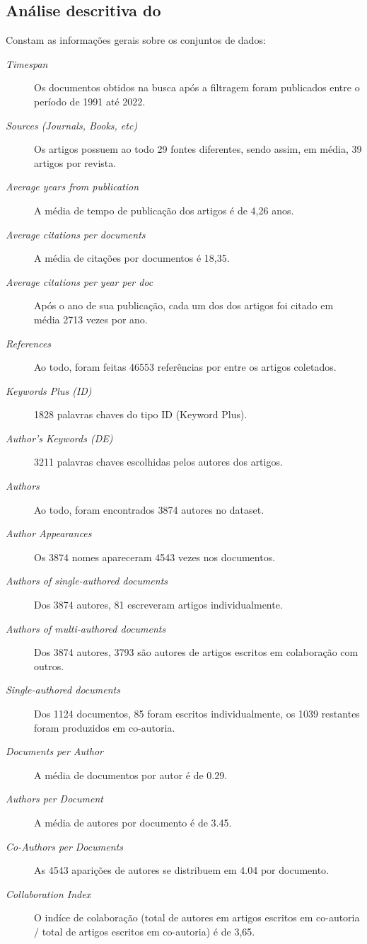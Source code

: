 \subsection{Análise descritiva do \dataset\   }

Constam as informações gerais sobre os conjuntos de dados:
\begin{description}
    \item [\textit{Timespan}] Os documentos obtidos na busca após a filtragem foram publicados entre o período de 1991 até 2022.
    \item [\textit{Sources (Journals, Books, etc)}] Os artigos possuem ao todo 29 fontes diferentes, sendo assim, em média, 39 artigos por revista.
    \item [\textit{Average years from publication}] A média de tempo de publicação dos artigos é de 4,26 anos.
    \item [\textit{Average citations per documents}] A média de citações por documentos é 18,35.
    \item [\textit{Average citations per year per doc}] Após o ano de sua publicação, cada um dos dos artigos foi citado em média 2713 vezes por ano.
    \item [\textit{References}] Ao todo, foram feitas 46553  referências por entre os artigos coletados.
    \item [\textit{Keywords Plus (ID)}] 1828 palavras chaves do tipo ID (Keyword Plus).
    \item [\textit{Author's Keywords (DE)}]  3211 palavras chaves escolhidas pelos autores dos artigos.

    \item [\textit{Authors}]  Ao todo, foram encontrados 3874 autores no dataset.
    \item [\textit{Author Appearances}] Os 3874 nomes apareceram 4543 vezes nos documentos.
    \item [\textit{Authors of single-authored documents}] Dos 3874 autores, 81 escreveram artigos individualmente.
    \item [\textit{Authors of multi-authored documents}] Dos 3874 autores, 3793 são autores de artigos escritos em colaboração com outros.
    \item [\textit{Single-authored documents}] Dos 1124 documentos, 85 foram escritos individualmente, os 1039 restantes foram produzidos em co-autoria.
    \item [\textit{Documents per Author}] A média de documentos por autor é de 0.29.
    \item [\textit{Authors per Document}] A média de autores por documento é de 3.45.
    \item [\textit{Co-Authors per Documents}] As 4543 aparições de autores se distribuem em 4.04 por documento.
    \item [\textit{Collaboration Index}] O indíce de colaboração (total de autores em artigos escritos em co-autoria / total de artigos escritos em co-autoria) é de 3,65.
\end{description}

